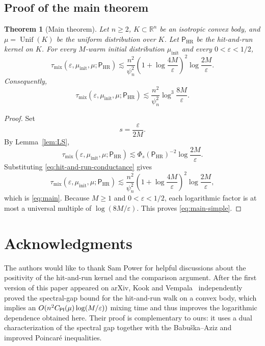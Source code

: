 \documentclass[11pt]{article}
\newtheorem{theorem}{Theorem}[section]
\theoremstyle{definition}
\theoremstyle{remark}
\newcommand{\R}{\mathbb R}
\newcommand{\Unif}{\operatorname{Unif}}
\newcommand{\mix}{\mathrm{mix}}
\newcommand{\HR}{\mathsf P_{\mathrm{HR}}}
\begin{document}
\subsection{Proof of the main theorem}

\begin{theorem}[Main theorem]\label{thm:main_formal}
Let $n\ge2$, $K\subset\R^n$ be an isotropic convex body, and $\mu=\Unif(K)$ be the uniform distribution over $K$.
Let $\HR$ be the hit-and-run kernel on $K$.  For
every $M$-warm initial distribution $\mu_{\mathrm{init}}$ and every
$0<\varepsilon<1/2$,
\begin{equation}\label{eq:main}
 \tau_{\mix}(\varepsilon,\mu_{\mathrm{init}},\mu;\HR)
 \lesssim
 \frac{n^2}{\psi_n^2}
 \left(1+\log\frac{4M}{\varepsilon}\right)^2
 \log\frac{2M}{\varepsilon}.
\end{equation}
Consequently,
\begin{equation}\label{eq:main-simple}
 \tau_{\mix}(\varepsilon,\mu_{\mathrm{init}},\mu;\HR)
 \lesssim \frac{n^2}{\psi_n^2}\log^3\frac{8M}{\varepsilon}.
\end{equation}
\end{theorem}

\begin{proof}
Set
\[
 s=\frac{\varepsilon}{2M}.
\]
By Lemma~\ref{lem:LS},
\[
 \tau_{\mix}\left(\varepsilon,\mu_{\mathrm{init}},\mu;\HR\right)
 \lesssim
 \Phi_s\left(\HR\right)^{-2}\log\frac{2M}{\varepsilon}.
\]
Substituting \eqref{eq:hit-and-run-conductance} gives
\[
 \tau_{\mix}\left(\varepsilon,\mu_{\mathrm{init}},\mu;\HR\right)
 \lesssim
 \frac{n^2}{\psi_n^2}
 \left(1+\log\frac{4M}{\varepsilon}\right)^2
 \log\frac{2M}{\varepsilon},
\]
which is \eqref{eq:main}.  Because $M\ge1$ and
$0<\varepsilon<1/2$, each logarithmic factor is at most a universal
multiple of $\log(8M/\varepsilon)$.  This proves
\eqref{eq:main-simple}.
\end{proof}

\section*{Acknowledgments}
The authors would like to thank Sam Power for helpful discussions about the positivity of the hit-and-run kernel and the comparison argument. After the first version of this paper appeared on arXiv, Kook and Vempala~\cite{kook2026spectral} independently proved the spectral-gap bound for the hit-and-run walk on a convex body, which implies an $O(n^2C_{\sf PI}(\mu)\log(M/\varepsilon))$ mixing time and thus improves the logarithmic dependence obtained here.  Their proof is complementary to ours: it uses a dual characterization of the spectral gap together with the Babu\v{s}ka--Aziz and improved Poincar\'e inequalities.
\end{document}
